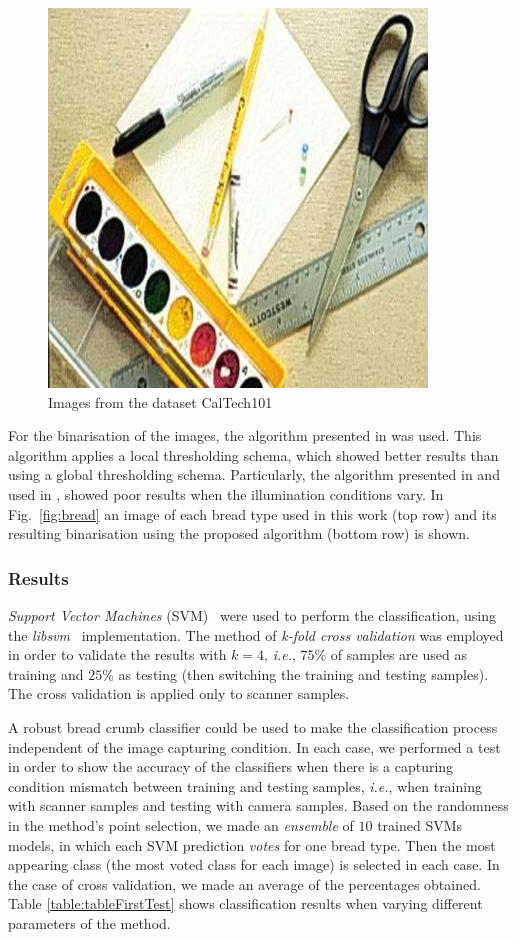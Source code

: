 \documentclass[oneside,a4paper,english,links]{article}
\begin{document}
\begin{figure}[htb]
\includegraphics[scale=0.20]{imagenes/image_0048}
\caption{Images from the dataset CalTech101}
\label{fig:nonbread}
\end{figure}

For the binarisation of the images, the algorithm presented in \cite{White83} was used. This algorithm applies a local thresholding schema, which showed better results than using a global thresholding schema. Particularly, the algorithm presented in \cite{Huang95} and used in \cite{Gonzales2008}, showed poor results when the illumination conditions vary. In Fig.~\ref{fig:bread} an image of each bread type used in this work (top row) and its resulting binarisation using the proposed algorithm (bottom row) is shown.  

\subsubsection{Results}

{\em Support Vector Machines} (SVM)~\cite{Boser92} were used to perform the classification, using the {\em libsvm}~\cite{Chang2011} implementation. The method of {\em k-fold cross validation} was employed in order to validate the results with $k = 4$, {\em i.e.}, $75\%$ of samples are used as training and $25\%$ as testing (then switching the training and testing samples). The cross validation is applied only to scanner samples.

A robust bread crumb classifier could be used to make the classification process independent of the image capturing condition. In each case, we performed a test in order to show the accuracy of the classifiers when there is a capturing condition mismatch between training and testing samples, {\em i.e.}, when training with scanner samples and testing with camera samples. Based on the randomness in the method's point selection, we made an {\em ensemble} of $10$ trained SVMs models, in which each SVM prediction {\em votes} for one bread type. Then the most appearing class (the most voted class for each image) is selected in each case. In the case of cross validation, we made an average of the percentages obtained. Table \ref{table:tableFirstTest} shows classification results when varying different parameters of the method.
\end{document}
